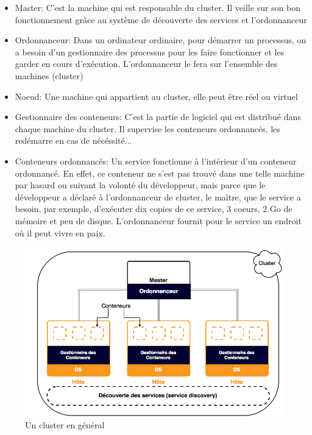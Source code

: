 \begin{onehalfspace}
\begin{itemize}
	\item Master: C'est la machine qui est responsable du cluster. Il veille sur son bon fonctionnement grâce au système de découverte des services et l'ordonnanceur
	\item Ordonnanceur: Dans un ordinateur ordinaire, pour démarrer un processus, on a besoin d'un gestionnaire des processus pour les faire fonctionner et les garder en cours d'exécution. L'ordonnanceur le fera sur l'ensemble des machines (cluster)
	\item Noeud: Une machine qui appartient au cluster, elle peut être réel ou virtuel
	\item Gestionnaire des conteneurs: C'est la partie de logiciel qui est distribué dans chaque machine du cluster. Il supervise les conteneurs ordonnancés, les redémarre en cas de nécéssité...
	\item Conteneurs ordonnancés: Un service fonctionne à l'intérieur d'un conteneur ordonnancé. En effet, ce conteneur ne s'est pas trouvé dans une telle machine par hasard ou suivant la volonté du développeur, mais parce que le développeur a déclaré à l'ordonnanceur de cluster, le maître, que le service a besoin, par exemple, d'exécuter dix copies de ce service, 3 coeurs, 2 Go de mémoire et peu de disque. L'ordonnanceur fournit pour le service un endroit où il peut vivre en paix.
\end{itemize}


\begin{figure}[H]
\centering
\includegraphics [scale=0.55]{chapitre3/assets/cluster}
\caption{Un cluster en général}
\label{fig:}
\end{figure}


\end{onehalfspace}
